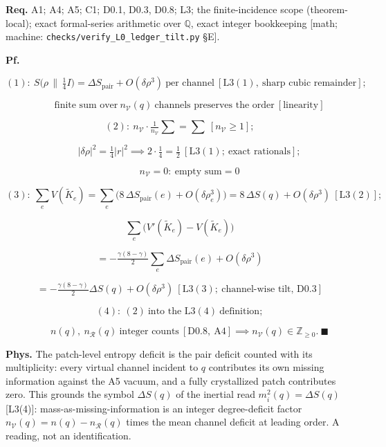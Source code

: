 \begin{theorem}
\textbf{Req.} A1; A4; A5; C1; D0.1, D0.3, D0.8; L3; the finite-incidence scope (theorem-local); exact formal-series arithmetic over $\mathbb Q$, exact integer bookkeeping [math; machine: \texttt{checks/\allowbreak{}verify\_\allowbreak{}L0\_\allowbreak{}ledger\_\allowbreak{}tilt.py} §E].

\textbf{Pf.}

\[
(1):\ S\bigl(\rho\,\|\,\tfrac14I\bigr)=\Delta S_{\mathrm{pair}}+O(\delta\rho^3)\ \text{per channel}\ [\mathrm{L3}(1),\ \text{sharp cubic remainder}];
\]

\[
\qquad \text{finite sum over}\ n_{\mathcal V}(q)\ \text{channels preserves the order}\ [\text{linearity}]
\]

\[
(2):\ n_{\mathcal V}\cdot\tfrac1{n_{\mathcal V}}\textstyle\sum=\sum\ [n_{\mathcal V}\ge1];
\]

\[
\qquad |\delta\rho|^2=\tfrac14|r|^2\implies2\cdot\tfrac14=\tfrac12\ [\mathrm{L3}(1);\ \text{exact rationals}];
\]

\[
\qquad n_{\mathcal V}=0:\ \text{empty sum}=0
\]

\[
(3):\ \textstyle\sum_eV(\tilde K_e)=\sum_e\bigl(8\,\Delta S_{\mathrm{pair}}(e)+O(\delta\rho_e^3)\bigr)=8\,\Delta S(q)+O(\delta\rho^3)\ [\mathrm{L3}(2)];
\]

\[
\textstyle\sum_e\bigl(V'(\tilde K_e)-V(\tilde K_e)\bigr)
\]

\[
= -\tfrac{\gamma(8-\gamma)}2\sum_e\Delta S_{\mathrm{pair}}(e)+O(\delta\rho^3)
\]

\[
= -\tfrac{\gamma(8-\gamma)}2\Delta S(q)+O(\delta\rho^3)\ [\mathrm{L3}(3);\ \text{channel-wise tilt, D0.3}]
\]

\[
(4):\ (2)\ \text{into the L3}(4)\ \text{definition};
\]

\[
\qquad n(q),\ n_{\mathcal R}(q)\ \text{integer counts}\ [\mathrm{D0.8},\ \mathrm{A4}]\implies n_{\mathcal V}(q)\in\mathbb Z_{\ge0}.\ \blacksquare
\]

\textbf{Phys.} The patch-level entropy deficit is the pair deficit counted with its multiplicity: every virtual channel incident to $q$ contributes its own missing information against the A5 vacuum, and a fully crystallized patch contributes zero. This grounds the symbol $\Delta S(q)$ of the inertial read $m_i^2(q)=\Delta S(q)$ [L3(4)]: mass-as-missing-information is an integer degree-deficit factor $n_{\mathcal V}(q)=n(q)-n_{\mathcal R}(q)$ times the mean channel deficit at leading order. A reading, not an identification.

\end{theorem}

